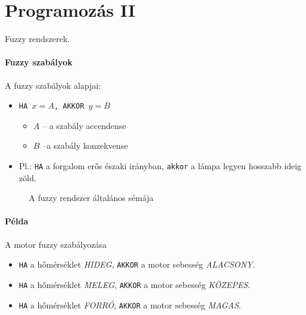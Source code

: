 \documentclass[../../main.tex]{subfiles}
\begin{document}
\section{Programozás II}

\begin{fulltheorem}
  Fuzzy rendszerek.
\end{fulltheorem}


\paragraph{Fuzzy szabályok} A fuzzy szabályok alapjai:
\begin{itemize}
  \item \texttt{HA $x = A$, AKKOR $y = B$}
        \begin{itemize}
          \item $A$ -- a szabály accendense
          \item $B$ --a szabály konzekvense
        \end{itemize}
  \item Pl.: \texttt{HA} a forgalom erős északi irányban,
        \texttt{akkor} a lámpa legyen hosszabb ideig zöld.
\end{itemize}

\begin{figure}[htb]
  \centering
  \caption{A fuzzy rendszer általános sémája}
  \label{fig:fuzzy-scheme}
\end{figure}

\paragraph{Példa} A motor fuzzy szabályozása
\begin{itemize}
  \item \texttt{HA} a hőmérséklet \textit{HIDEG},
        \texttt{AKKOR} a motor sebesség \textit{ALACSONY}.
  \item \texttt{HA} a hőmérséklet \textit{MELEG},
        \texttt{AKKOR} a motor sebesség \textit{KÖZEPES}.
  \item \texttt{HA} a hőmérséklet \textit{FORRÓ},
        \texttt{AKKOR} a motor sebesség \textit{MAGAS}.
\end{itemize}
\end{document}
